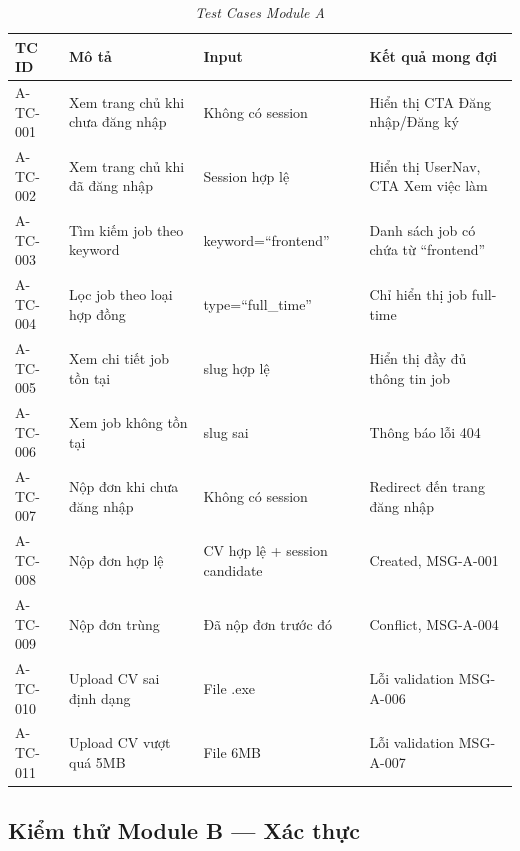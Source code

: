 \begin{table}[H]
    \centering
    \small
    \renewcommand{\arraystretch}{1.3}
    \begin{tabularx}{\textwidth}{|>{\centering\arraybackslash}p{2.2cm}|>{\raggedright\arraybackslash}X|>{\raggedright\arraybackslash}X|>{\raggedright\arraybackslash}X|}
        \hline
        \textbf{TC ID} & \textbf{Mô tả} & \textbf{Input} & \textbf{Kết quả mong đợi} \\ \hline
        A-TC-001 & Xem trang chủ khi chưa đăng nhập & Không có session & Hiển thị CTA Đăng nhập/Đăng ký \\ \hline
        A-TC-002 & Xem trang chủ khi đã đăng nhập & Session hợp lệ & Hiển thị UserNav, CTA Xem việc làm \\ \hline
        A-TC-003 & Tìm kiếm job theo keyword & keyword=``frontend'' & Danh sách job có chứa từ ``frontend'' \\ \hline
        A-TC-004 & Lọc job theo loại hợp đồng & type=``full\_time'' & Chỉ hiển thị job full-time \\ \hline
        A-TC-005 & Xem chi tiết job tồn tại & slug hợp lệ & Hiển thị đầy đủ thông tin job \\ \hline
        A-TC-006 & Xem job không tồn tại & slug sai & Thông báo lỗi 404 \\ \hline
        A-TC-007 & Nộp đơn khi chưa đăng nhập & Không có session & Redirect đến trang đăng nhập \\ \hline
        A-TC-008 & Nộp đơn hợp lệ & CV hợp lệ + session candidate & 201 Created, MSG-A-001 \\ \hline
        A-TC-009 & Nộp đơn trùng & Đã nộp đơn trước đó & 409 Conflict, MSG-A-004 \\ \hline
        A-TC-010 & Upload CV sai định dạng & File .exe & Lỗi validation MSG-A-006 \\ \hline
        A-TC-011 & Upload CV vượt quá 5MB & File 6MB & Lỗi validation MSG-A-007 \\ \hline
    \end{tabularx}
    \caption{\textit{Test Cases Module A}}
\end{table}

\subsection{Kiểm thử Module B — Xác thực}

